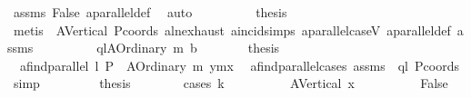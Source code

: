 \begin{isabellebody}
\ assms\ False\ a{}parallel{\isacharunderscore}{\kern0pt}def\ \isamarkupfalse%
\ auto\isanewline
\ \ \ \ \ \ \isamarkupfalse%
\ \isamarkupfalse%
\ {\isacharquery}{\kern0pt}thesis\ \isanewline
\ \ \ \ \ \ \isamarkupfalse%
\ {\isacharparenleft}{\kern0pt}metis\ {\isachardoublequoteopen}{}{\isachardoublequoteclose}\ A{}Vertical\ Pcoords\ a{}ln{\isachardot}{\kern0pt}exhaust\ a{}incid{\isachardot}{\kern0pt}simps{\isacharparenleft}{\kern0pt}{}{\isacharparenright}{\kern0pt}\ a{}parallel{\isacharunderscore}{\kern0pt}caseV{\isacharparenleft}{\kern0pt}{}{\isacharparenright}{\kern0pt}\ a{}parallel{\isacharunderscore}{\kern0pt}def\ assms{\isacharparenleft}{\kern0pt}{}{\isacharparenright}{\kern0pt}{\isacharparenright}{\kern0pt}\isanewline
\ \ \isamarkupfalse%
\isanewline
{}\isamarkupfalse%
\isanewline
\ \ \ \ \isamarkupfalse%
\ \ ql{\isacharcolon}{\kern0pt}{\isacharparenleft}{\kern0pt}A{}Ordinary\ m\ b{\isacharparenright}{\kern0pt}\isanewline
\ \ \ \ \isamarkupfalse%
\ \isamarkupfalse%
\ {\isacharquery}{\kern0pt}thesis\isanewline
\ \ \ \ \isamarkupfalse%
\ {\isacharminus}{\kern0pt}\isanewline
\ \ \ \ \ \ \isamarkupfalse%
\ {}{\isacharcolon}{\kern0pt}\ {\isachardoublequoteopen}a{}find{\isacharunderscore}{\kern0pt}parallel\ l\ P\ {\isacharequal}{\kern0pt}\ {\isacharparenleft}{\kern0pt}A{}Ordinary\ m\ {\isacharparenleft}{\kern0pt}y{}{\isacharminus}{\kern0pt}m{\isacharasterisk}{\kern0pt}x{}{\isacharparenright}{\kern0pt}{\isacharparenright}{\kern0pt}{\isachardoublequoteclose}\ \isamarkupfalse%
\ a{}find{\isacharunderscore}{\kern0pt}parallel{\isachardot}{\kern0pt}cases\ assms\ \ ql\ Pcoords\ \isamarkupfalse%
\ simp\ \isanewline
\ \ \ \ \ \ \isamarkupfalse%
\ {\isacharquery}{\kern0pt}thesis\isanewline
\ \ \ \ \ \ \isamarkupfalse%
\ {\isacharparenleft}{\kern0pt}cases\ k{\isacharparenright}{\kern0pt}\isanewline
\ \ \ \ \ \ \ \ \isamarkupfalse%
\ {\isacharparenleft}{\kern0pt}A{}Vertical\ x{}{\isacharparenright}{\kern0pt}\isanewline
\ \ \ \ \ \ \ \ \isamarkupfalse%
\ {\isachardoublequoteopen}False{\isachardoublequoteclose}\ \isamarkupfalse%

\end{isabellebody}
